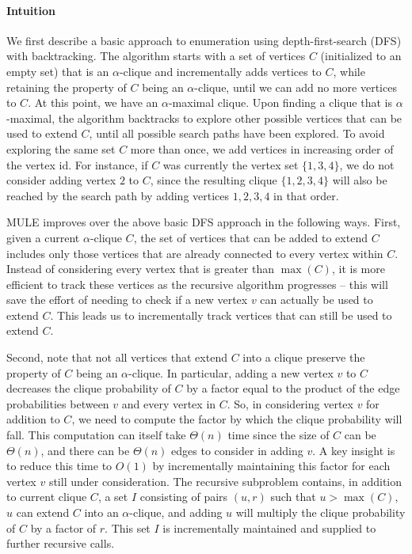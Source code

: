 \documentclass[11pt,letterpaper]{article}
\newcommand{\ugraph}{\mathcal{G}}
\begin{document}

\paragraph{Intuition}
We first describe a basic approach to enumeration using depth-first-search (DFS) with backtracking. The algorithm starts with a set of vertices $C$ (initialized to an empty set) that is an $\alpha$-clique and incrementally adds vertices to $C$, while retaining the property of $C$ being an $\alpha$-clique, until we can add no more vertices to $C$. At this point, we have an $\alpha$-maximal clique. Upon finding a clique that is $\alpha$-maximal, the algorithm backtracks to explore other possible vertices that can be used to extend $C$, until all possible search paths have been explored. To avoid exploring the same set $C$ more than once, we add vertices in increasing order of the vertex id. For instance, if $C$ was currently the vertex set $\{1,3,4\}$, we do not consider adding vertex $2$ to $C$, since the resulting clique $\{1,2,3,4\}$ will also be reached by the search path by adding vertices $1,2,3,4$ in that order. 

MULE improves over the above basic DFS approach in the following ways. First, given a current $\alpha$-clique $C$, the set of vertices that can be added to extend $C$ includes only those vertices that are already connected to every vertex within $C$. Instead of considering every vertex that is greater than $\max(C)$, it is more efficient to track these vertices as the recursive algorithm progresses -- this will save the effort of needing to check if a new vertex $v$ can actually be used to extend $C$. This leads us to incrementally track vertices that can still be used to extend $C$. 

Second, note that not all vertices that extend $C$ into a clique preserve the property of $C$ being an $\alpha$-clique. In particular, adding a new vertex $v$ to $C$ decreases the clique probability of $C$ by a factor equal to the product of the edge probabilities between $v$ and every vertex in $C$. So, in considering vertex $v$ for addition to $C$, we need to compute the factor by which the clique probability will fall. This computation can itself take $\Theta(n)$ time since the size of $C$ can be $\Theta(n)$, and there can be $\Theta(n)$ edges to consider in adding $v$. A key insight is to reduce this time to $O(1)$ by incrementally maintaining this factor for each vertex $v$ still under consideration. The recursive subproblem contains, in addition to current clique $C$, a set $I$ consisting of pairs $(u,r)$ such that $u > \max(C)$, $u$ can extend $C$ into an $\alpha$-clique, and adding $u$ will multiply the clique probability of $C$ by a factor of $r$. This set $I$ is incrementally maintained and supplied to further recursive calls.
\end{document}

